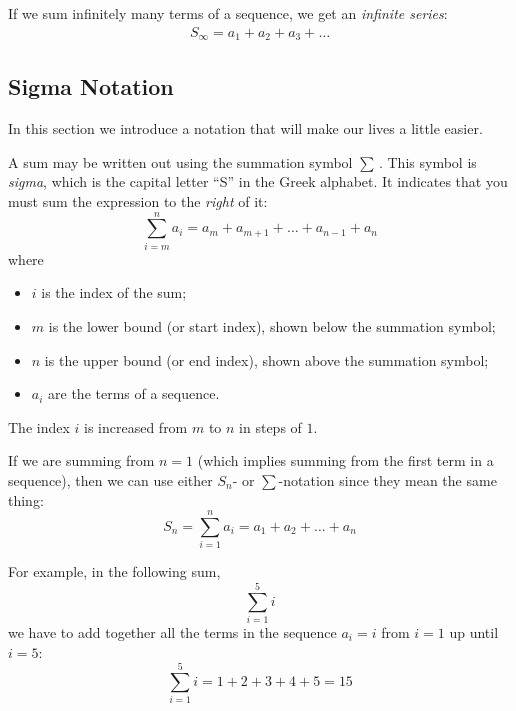 If we sum infinitely many terms of a sequence, we get an \textit{infinite series}:
\begin{eqnarray}
S_\infty = a_1 + a_2 + a_3 + \ldots
\end{eqnarray}

\subsection{Sigma Notation}

In this section we introduce a notation that will make our lives a little easier.

A sum may be written out using the summation symbol $\sum$\,. This symbol is \textit{sigma}, which is the capital letter ``S'' in the Greek alphabet. It indicates that you must sum the expression to the \textit{right} of it:
\begin{equation}
\label{eq:mp:se:sigma}
\sum_{i=m}^n a_i = a_m + a_{m+1} + \ldots + a_{n-1}+ a_n
\end{equation}
where
\begin{itemize}
\item $i$ is the index of the sum;
\item $m$ is the lower bound (or start index), shown below the summation symbol;
\item $n$ is the upper bound (or end index), shown above the summation symbol;
\item $a_i$ are the terms of a sequence.
\end{itemize}

The index $i$ is increased from $m$ to $n$ in steps of $1$.

If we are summing from $n=1$ (which implies summing from the first term in a sequence), then we can use either $S_n$- or $\sum$-notation since they mean the same thing:
\begin{equation}
\label{eq:mp:se:Ssigma}
S_n=\sum_{i=1}^n a_i = a_1 + a_2 + \ldots + a_n
\end{equation}

For example, in the following sum,
\begin{equation*}
\sum_{i=1}^5 i
\end{equation*}
we have to add together all the terms in the sequence $a_i=i$ from $i=1$ up until $i=5$:
\begin{equation*}
\sum_{i=1}^5 i = 1 + 2 + 3 + 4 + 5 = 15
\end{equation*}


